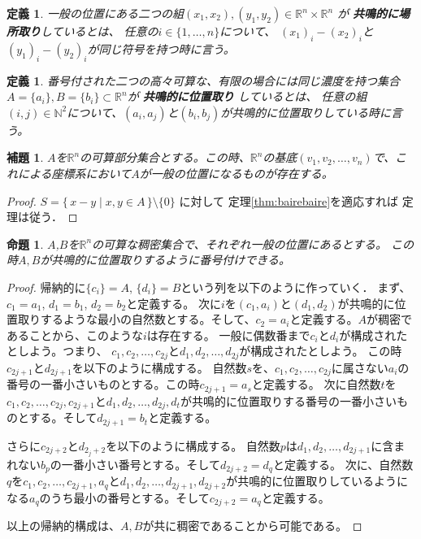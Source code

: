 \documentclass[leqno, a4paper, 12pt]{jsarticle}
\newtheorem{prop}[thm]{命題}
\newtheorem{lem}[thm]{補題}
\newtheorem{df}[thm]{定義}
\newcommand{\nn}{\mathbb{N}}
\newcommand{\rr}{\mathbb{R}}
\begin{document}
\begin{df}
一般の位置にある二つの組$(x_1,x_2), (y_1, y_2)\in \rr^n\times \rr^n$
が
\textbf{共鳴的に場所取り}しているとは、
任意の$i\in \{1,\dots, n\}$について、
$(x_1)_i-(x_2)_i$と$(y_1)_i-(y_2)_i$が同じ符号を持つ時に言う。
\end{df}
\begin{df}
番号付された二つの高々可算な、有限の場合には同じ濃度を持つ集合$A=\{a_i\},B=\{b_i\}\subset \rr^n$が
\textbf{共鳴的に位置取り}
しているとは、
任意の組$(i,j)\in \nn^2$について、$(a_i,a_j)$と$(b_i,b_j)$が共鳴的に位置取りしている時に言う。
\end{df}

\begin{lem}
$A$を$\rr^n$の可算部分集合とする。この時、$\rr^n$の基底$(v_1,v_2,\dots, v_n)$で、これによる座標系において$A$が一般の位置になるものが存在する。
\end{lem}
\begin{proof}
$S=\{\, 
x-y\mid x, y\in A
\, \}\setminus \{0\}$
に対して
定理\ref{thm:bairebaire}を適応すれば
定理は従う．
\end{proof}

\begin{prop}
$A$,$B$を$\rr^n$の可算な稠密集合で、それぞれ一般の位置にあるとする。
この時$A,B$が共鳴的に位置取りするように番号付けできる。
\end{prop}
\begin{proof}
帰納的に$\{c_i\}=A$, $\{d_i\}=B$という列を以下のように作っていく．
まず、$c_1=a_1$, $d_1=b_1$, $d_2=b_2$と定義する。
次に$i$を$(c_1,a_i)$と$(d_1,d_2)$が共鳴的に位置取りするような最小の自然数とする。そして、$c_2=a_i$と定義する。$A$が稠密であることから、このような$i$は存在する。
一般に偶数番まで$c_i$と$d_i$が構成されたとしよう。つまり、
$c_1, c_2, \dots, c_{2j}$と$d_1,d_2,\dots, d_{2j}$が構成されたとしよう。
この時$c_{2j+1}$と$d_{2j+1}$を以下のように構成する。
自然数$s$を、$c_1,c_2,\dots, c_{2j}$に属さない$a_i$の番号の一番小さいものとする。この時$c_{2j+1}=a_s$と定義する。
次に自然数$t$を$c_1,c_2,\dots, c_{2j}, c_{2j+1}$と$d_1, d_2, \dots, d_{2j}, d_{t}$が共鳴的に位置取りする番号の一番小さいものとする。そして$d_{2j+1}=b_t$と定義する。

さらに$c_{2j+2}$と$d_{2_j+2}$を以下のように構成する。
自然数$p$は$d_1, d_2, \dots, d_{2j+1}$に含まれない$b_p$の一番小さい番号とする。そして$d_{2j+2}=d_q$と定義する。
次に、自然数$q$を$c_1, c_2, \dots, c_{2j+1}, a_q$と$d_1, d_2, \dots, d_{2j+1}, d_{2j+2}$が共鳴的に位置取りしているようになる$a_q$のうち最小の番号とする。そして$c_{2j+2}=a_q$と定義する。

以上の帰納的構成は、$A,B$が共に稠密であることから可能である。
\end{proof}
\end{document}
